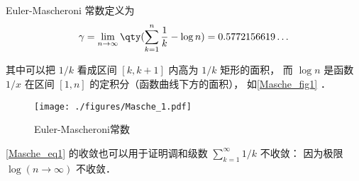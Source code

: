 
\begin{issues}
\issueDraft
\end{issues}


Euler-Mascheroni 常数定义为
\begin{equation}\label{Masche_eq1}
\gamma = \lim_{n\to\infty} \qty(\sum_{k=1}^n \frac{1}{k} - \log n) = 0.5772156619\dots
\end{equation}

其中可以把 $1/k$ 看成区间 $[k, k+1]$ 内高为 $1/k$ 矩形的面积， 而 $\log n$ 是函数 $1/x$ 在区间 $[1,n]$ 的定积分（函数曲线下方的面积）， 如\autoref{Masche_fig1} ．

\begin{figure}[ht]
\centering
\texttt{[image: ./figures/Masche\_1.pdf]}
\caption{Euler-Mascheroni常数} \label{Masche_fig1}
\end{figure}

\autoref{Masche_eq1} 的收敛也可以用于证明调和级数 $\sum_{k=1}^\infty 1/k$ 不收敛： 因为极限 $\log(n\to\infty)$ 不收敛．
